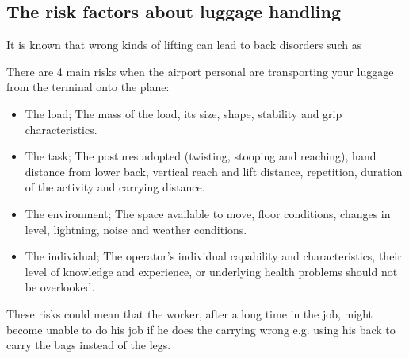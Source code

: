 \subsection{The risk factors about luggage handling}

It is known that wrong kinds of lifting can lead to back disorders such as 

There are 4 main risks when the airport personal are transporting your luggage from the terminal onto the plane:

\begin{itemize}
\item The load; The mass of the load, its size, shape, stability and grip characteristics.
\item The task; The postures adopted (twisting, stooping and reaching), hand distance from lower back, vertical reach and lift distance, repetition, duration of the activity and carrying distance.
\item The environment; The space available to move, floor conditions, changes in level, lightning, noise and weather conditions.
\item The individual; The operator's individual capability and characteristics, their level of knowledge and experience, or underlying health problems should not be overlooked.
\end{itemize}

These risks could mean that the worker, after a long time in the job, might become unable to do his job if he does the carrying wrong e.g. using his back to carry the bags instead of the legs.